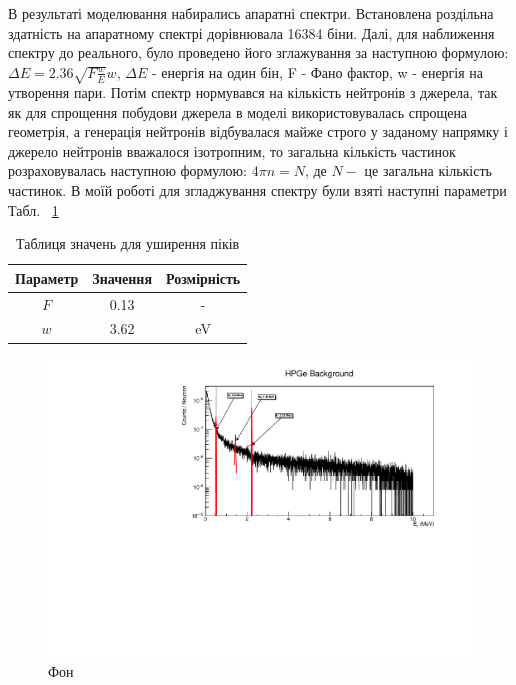 \documentclass[a4paper, 14pt]{article}
\numberwithin{equation}{section}
\numberwithin{table}{section}
\begin{document}
В результаті моделювання набирались апаратні спектри. Встановлена роздільна здатність на апаратному спектрі дорівнювала 16384 біни. Далі, для наближення спектру до реального, було проведено його зглажування за наступною формулою: $\Delta{E} = 2.36 \sqrt{F  \frac{w}{E}}  w$, $\Delta{E}$ - енергія на один бін, F - Фано фактор, w - енергія на утворення пари. Потім спектр нормувався на кількість нейтронів з джерела, так як для спрощення побудови джерела в моделі використовувалась спрощена геометрія, а генерація нейтронів відбувалася майже строго у заданому напрямку і джерело нейтронів вважалося ізотропним, то загальна кількість частинок розраховувалась наступною формулою: $ 4 \pi n = N$, де $N -$ це загальна кількість частинок. В моїй роботі для згладжування спектру були взяті наступні параметри Табл. ~\ref{tabl:Param}
\begin{table}[h]
	\centering
	\caption{Таблиця значень для уширення піків} 
	\begin{tabular}{|c|c|c|} 
		\hline
		Параметр & Значення &  Розмірність \\
		\hline
		$F$ & 0.13 & - \\
		\hline
		$w$ & 3.62 & eV \\		
		\hline
	\end{tabular}
	\label{tabl:Param}
\end{table}
\begin{figure}[hbt!]
	\centering \includegraphics[width=1\textwidth]{res/background.pdf}
	\caption{Фон} 
	\label{ris:FonPicks}	
\end{figure} 
\end{document}
